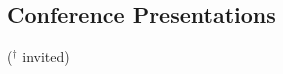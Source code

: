 \documentclass[10pt]{article}
\begin{document}
\vspace{+0.1in}

{\small
\begin{etaremune}
\item 
\end{etaremune}

}

\subsection*{Conference Presentations}({\small $\boldsymbol {^\dagger}$ invited) }
{\small
\begin{etaremune}
\item 

\end{etaremune}
}


\end{document}
